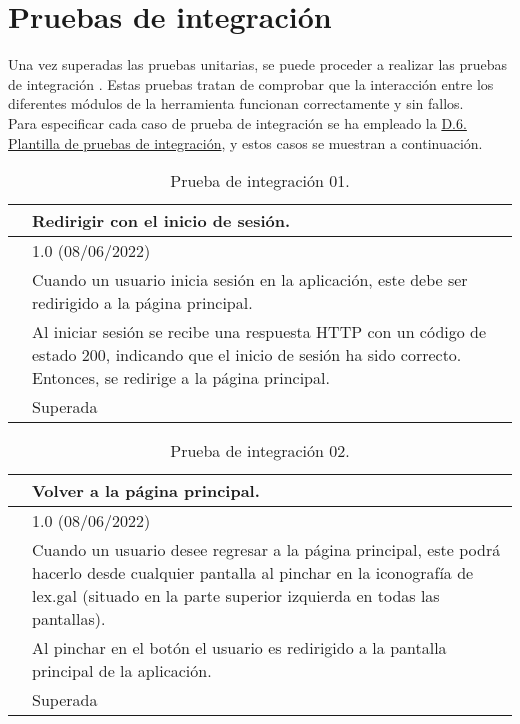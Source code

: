 \section{Pruebas de integración}

Una vez superadas las pruebas unitarias, se puede proceder a realizar las pruebas de integración \cite{pruebaintegracion}. Estas pruebas tratan de comprobar que la interacción entre los diferentes módulos de la herramienta funcionan correctamente y sin fallos. 
\\

Para especificar cada caso de prueba de integración se ha empleado la \hyperref[enlacePIX]{D.6. Plantilla de pruebas de integración}, y estos casos se muestran a continuación.

\begin{table}[H]
\begin{center}
\begin{tabular}{|p{3cm}|p{10cm}|} \hline
\centering {\bf PI-01} & Redirigir con el inicio de sesión.  \\ \hline\hline
\centering {\bf Versión} & 1.0 (08/06/2022) \\ \hline
\centering {\bf Descripción} & Cuando un usuario inicia sesión en la aplicación, este debe ser redirigido a la página principal. \\ \hline
\centering {\bf Criterio de aceptación} & Al iniciar sesión se recibe una respuesta HTTP con un código de estado 200, indicando que el inicio de sesión ha sido correcto. Entonces, se redirige a la página principal. \\ \hline
\centering {\bf Estado} & Superada \\ \hline
\end{tabular}
\caption{Prueba de integración 01.}
\label{enlacePI1}
\end{center}
\end{table}

\begin{table}[H]
\begin{center}
\begin{tabular}{|p{3cm}|p{10cm}|} \hline
\centering {\bf PI-02} & Volver a la página principal.  \\ \hline\hline
\centering {\bf Versión} & 1.0 (08/06/2022) \\ \hline
\centering {\bf Descripción} & Cuando un usuario desee regresar a la página principal, este podrá hacerlo desde cualquier pantalla al pinchar en la iconografía de lex.gal (situado en la parte superior izquierda en todas las pantallas). \\ \hline
\centering {\bf Criterio de aceptación} & Al pinchar en el botón el usuario es redirigido a la pantalla principal de la aplicación. \\ \hline
\centering {\bf Estado} & Superada \\ \hline
\end{tabular}
\caption{Prueba de integración 02.}
\label{enlacePI2}
\end{center}
\end{table}

